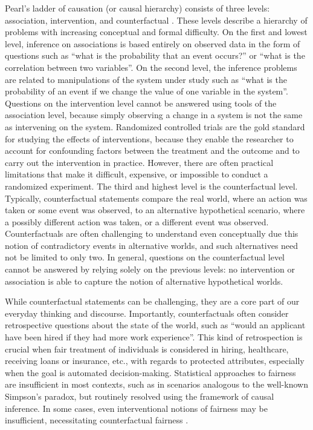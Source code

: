 Pearl's ladder of causation (or causal hierarchy) consists of three levels: association, intervention, and counterfactual \citep{pearl2009}. These levels describe a hierarchy of problems with increasing conceptual and formal difficulty. On the first and lowest level, inference on associations is based entirely on observed data in the form of questions such as ``what is the probability that an event occurs?'' or ``what is the correlation between two variables''. On the second level, the inference problems are related to manipulations of the system under study such as ``what is the probability of an event if we change the value of one variable in the system''. Questions on the intervention level cannot be answered using tools of the association level, because simply observing a change in a system is not the same as intervening on the system. Randomized controlled trials are the gold standard for studying the effects of interventions, because they enable the researcher to account for confounding factors between the treatment and the outcome and to carry out the intervention in practice. However, there are often practical limitations that make it difficult, expensive, or impossible to conduct a randomized experiment. The third and highest level is the counterfactual level. Typically, counterfactual statements compare the real world, where an action was taken or some event was observed, to an alternative hypothetical scenario, where a possibly different action was taken, or a different event was observed. Counterfactuals are often challenging to understand even conceptually due this notion of contradictory events in alternative worlds, and such alternatives need not be limited to only two. In general, questions on the counterfactual level cannot be answered by relying solely on the previous levels: no intervention or association is able to capture the notion of alternative hypothetical worlds.

While counterfactual statements can be challenging, they are a core part of our everyday thinking and discourse. Importantly, counterfactuals often consider retrospective questions about the state of the world, such as ``would an applicant have been hired if they had more work experience''. This kind of retrospection is crucial when fair treatment of individuals is considered in hiring, healthcare, receiving loans or insurance, etc., with regards to protected attributes, especially when the goal is automated decision-making. Statistical approaches to fairness are insufficient in most contexts, such as in scenarios analogous to the well-known Simpson's paradox, but routinely resolved using the framework of causal inference. In some cases, even interventional notions of fairness may be insufficient, necessitating counterfactual fairness \citep{KusnerCounterfactual, ZhangBareinboim2018}.

